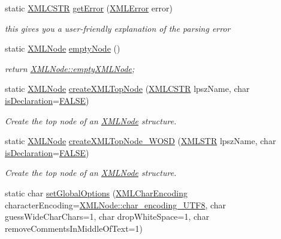 \begin{DoxyCompactItemize}
static \hyperlink{xmlParser_8h_acdb0d6fd8dd596384b438d86cfb2b182}{X\-M\-L\-C\-S\-T\-R} \hyperlink{group__conversions_ga615a6ca792929132043d1de511023772}{get\-Error} (\hyperlink{xmlParser_8h_ac39bd07b1461aaa70afffe2d7162b4f5}{X\-M\-L\-Error} error)
\begin{DoxyCompactList}\small\item\em this gives you a user-\/friendly explanation of the parsing error \end{DoxyCompactList}\item 
static \hyperlink{structXMLNode}{X\-M\-L\-Node} \hyperlink{group__navigate_ga47c8238226a693d0aaf1111f1fa44ea0}{empty\-Node} ()
\begin{DoxyCompactList}\small\item\em return \hyperlink{structXMLNode_a90565bdb240d2f14f6a3d43f15100b63}{X\-M\-L\-Node\-::empty\-X\-M\-L\-Node}; \end{DoxyCompactList}\item 
static \hyperlink{structXMLNode}{X\-M\-L\-Node} \hyperlink{group__creation_ga1e2d0403450db891eedc76b6bfdba452}{create\-X\-M\-L\-Top\-Node} (\hyperlink{xmlParser_8h_acdb0d6fd8dd596384b438d86cfb2b182}{X\-M\-L\-C\-S\-T\-R} lpsz\-Name, char \hyperlink{group__navigate_ga71df27d54a2dc09b0a456406a7e8c6d3}{is\-Declaration}=\hyperlink{xmlParser_8h_aa93f0eb578d23995850d61f7d61c55c1}{F\-A\-L\-S\-E})
\begin{DoxyCompactList}\small\item\em Create the top node of an \hyperlink{structXMLNode}{X\-M\-L\-Node} structure. \end{DoxyCompactList}\item 
static \hyperlink{structXMLNode}{X\-M\-L\-Node} \hyperlink{group__xmlWOSD_ga9c8b3bfa9671cb2a0a977ef30bab364a}{create\-X\-M\-L\-Top\-Node\-\_\-\-W\-O\-S\-D} (\hyperlink{xmlParser_8h_a849d96105aa0c8f64b5c10d9151a3cdc}{X\-M\-L\-S\-T\-R} lpsz\-Name, char \hyperlink{group__navigate_ga71df27d54a2dc09b0a456406a7e8c6d3}{is\-Declaration}=\hyperlink{xmlParser_8h_aa93f0eb578d23995850d61f7d61c55c1}{F\-A\-L\-S\-E})
\begin{DoxyCompactList}\small\item\em Create the top node of an \hyperlink{structXMLNode}{X\-M\-L\-Node} structure. \end{DoxyCompactList}\item 
static char \hyperlink{group__conversions_ga2e3943ac932bf3e786810234e7c295b9}{set\-Global\-Options} (\hyperlink{structXMLNode_a81bcd09f9c752b65633c1ca28ea025f2}{X\-M\-L\-Char\-Encoding} character\-Encoding=\hyperlink{structXMLNode_a81bcd09f9c752b65633c1ca28ea025f2a0b35b4d55aae2d232400578ab1123d5a}{X\-M\-L\-Node\-::char\-\_\-encoding\-\_\-\-U\-T\-F8}, char guess\-Wide\-Char\-Chars=1, char drop\-White\-Space=1, char remove\-Comments\-In\-Middle\-Of\-Text=1)

\end{DoxyCompactItemize}
